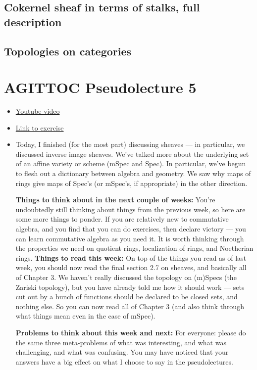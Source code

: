 \documentclass{book}
\theoremstyle{definition}
\begin{document}
\section{Cokernel sheaf in terms of stalks, full description}


\section{Topologies on categories}

\chapter{AGITTOC Pseudolecture 5}

\begin{itemize}
    \item \href{https://www.youtube.com/watch?v=zS3I4KKmtW0}{Youtube video}
    \item \href{https://math216.wordpress.com/2020/07/25/between-pseudolectures-5-and-6/}{Link to exercise}
    \item 
    Today, I finished (for the most part) discussing sheaves — in particular, we discussed inverse image sheaves. We’ve talked more about the underlying set of an affine variety or scheme (mSpec and Spec). In particular, we’ve begun to flesh out a dictionary between algebra and geometry. We saw why maps of rings give maps of Spec’s (or mSpec’s, if appropriate) in the other direction.

	\textbf{Things to think about in the next couple of weeks:}
	You’re undoubtedly still thinking about things from the previous week, so here are some more things to ponder. If you are relatively new to commutative algebra, and you find that you can do exercises, then declare victory — you can learn commutative algebra as you need it. It is worth thinking through the properties we need on quotient rings, localization of rings, and Noetherian rings.
	\textbf{Things to read this week:}
	On top of the things you read as of last week, you should now read the final section 2.7 on sheaves, and basically all of Chapter 3. We haven’t really discussed the topology on (m)Specs (the Zariski topology), but you have already told me how it should work --- sets cut out by a bunch of functions should be declared to be closed sets, and nothing else. So you can now read all of Chapter 3 (and also think through what things mean even in the case of mSpec).

	\textbf{Problems to think about this week and next:}
	For everyone: please do the same three meta-problems of what was interesting, and what was challenging, and what was confusing.
	You may have noticed that your answers have a big effect on what I choose to say in the pseudolectures.


\end{itemize}
\end{document}
